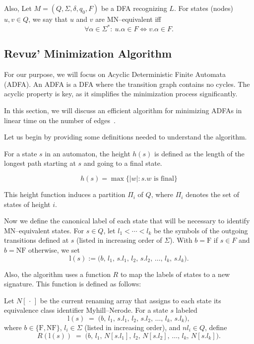 Also, Let $M=(Q,\Sigma,\delta,q_0,F)$ be a DFA recognizing $L$. For states (nodes) $u,v\in Q$, we say that $u$ and $v$ are MN--equivalent iff
\[
\forall \alpha \in \Sigma^*:\ u.\alpha \in F \iff v.\alpha \in F.
\]

\subsection{Revuz' Minimization Algorithm} \label{sec:revuz}
For our purpose, we will focus on Acyclic Deterministic Finite Automata (ADFA). An ADFA is a DFA where the transition graph contains no cycles. The acyclic property is key, as it simplifies the minimization process significantly. 

In this section, we will discuss an efficient algorithm for minimizing ADFAs in linear time on the number of edges~\cite{revuz1992minimisation}.

Let us begin by providing some definitions needed to understand the algorithm.

\begin{definition} \label{def:height}
    For a state $s$ in an automaton, the height $h(s)$ is defined as the length of the longest path starting at $s$ and going to a final state. 

    $$h(s) = \max\{|w|:s.w \text{ is final}\}$$
\end{definition}

This height function induces a partition $\Pi_i$ of $Q$, where $\Pi_i$ denotes the set of states of height $i$.

\begin{comment}
\begin{definition}[Distinguished set]
    We say that a set $\Pi_i$ is distinguished if no pairs of states in $\Pi_i$ are MN--equivalent.
\end{definition}
\end{comment}

Now we define the canonical label of each state that will be necessary to identify MN--equivalent states. For $s\in Q$, let $l_1<\cdots<l_k$ be the symbols of the outgoing transitions defined at $s$ (listed in increasing order of $\Sigma$). With $b=\text{F}$ if $s\in F$ and $b=\text{NF}$ otherwise, we set
\[
\mathrm{l}(s) := \big(b,\, l_1,\, s.l_1,\, l_2,\, s.l_2,\, \dots,\, l_k,\, s.l_k\big).
\]

Also, the algorithm uses a function $R$ to map the labels of states to a new signature. This function is defined as follows:
\begin{definition} \label{def:R}
Let $N[\,\cdot\,]$ be the current renaming array that assigns to each state its equivalence class identifier Myhill--Nerode.  
For a state $s$ labeled
\[
\mathrm{l}(s) \;=\; \big(b,\, l_1,\, s.l_1,\, l_2,\, s.l_2,\, \dots,\, l_k,\, s.l_k\big),
\]
where $b \in \{\text{F},\text{NF}\}$, $l_i \in \Sigma$ (listed in increasing order), and $nl_i \in Q$, define
\[
R\!\left(\mathrm{l}(s)\right) \;=\; \big(b,\, l_1,\, N[s.l_1],\, l_2,\, N[s.l_2],\, \dots,\, l_k,\, N[s.l_k]\big).
\]
\end{definition}

